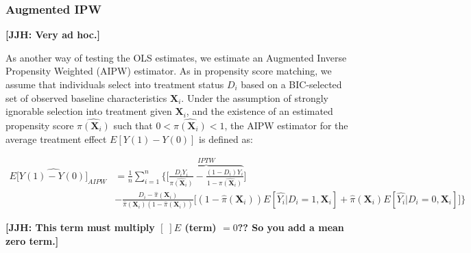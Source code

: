 \subsubsection{Augmented IPW} \label{subsubsection:aipw}

\textbf{[JJH: Very ad hoc.]}

As another way of testing the OLS estimates, we estimate an Augmented Inverse Propensity Weighted (AIPW) estimator. As in propensity score matching, we assume that individuals select into treatment status $D_i$ based on a BIC-selected set of observed baseline characteristics $\boldsymbol{X}_i$. Under the assumption of strongly ignorable selection into treatment given $\boldsymbol{X}_i$, and the existence of an estimated propensity score $\hat{\pi({\boldsymbol{X}_i})}$ such that $0<\hat{\pi({\boldsymbol{X}_i})}<1$, the AIPW estimator for the average treatment effect $E[Y(1)-Y(0)]$ is defined as:

\begin{align}\label{eq:AIPW}
E[\widehat{Y(1)-Y(0)]}_{AIPW} &= \frac{1}{n} \sum_{i=1}^{n} \bigg \{ \bigg[ \overbrace{\frac{D_i Y_i}{\hat{\pi(\boldsymbol{X}_i)}} - \frac{(1-D_i)Y_i}{1-\hat{\pi(\boldsymbol{X}_i)}}}^{IPTW} \bigg] \\[10pt]
& - \frac{D_i - \hat{\pi}(\boldsymbol{X}_i)}{\hat{\pi}(\boldsymbol{X}_i) (1-\hat{\pi}(\boldsymbol{X}_i))} \nonumber \bigg[ (1-\hat{\pi}(\boldsymbol{X}_i)) E[\hat{Y_i}|D_i=1,\boldsymbol{X}_i] + \hat{\pi}(\boldsymbol{X}_i) E[\hat{Y_i}|D_i=0,\boldsymbol{X}_i] \bigg] \bigg \}
\end{align}

\textbf{[JJH: This term must multiply $[\;] E$ (term) $=0$?? So you add a mean zero term.]}

